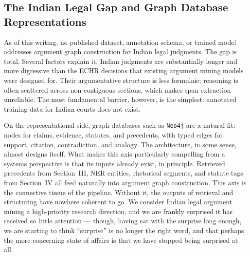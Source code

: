 \subsection{The Indian Legal Gap and Graph Database Representations}

As of this writing, no published dataset, annotation schema, or trained model addresses argument graph construction for Indian legal judgments. The gap is total. Several factors explain it. Indian judgments are substantially longer and more digressive than the ECHR decisions that existing argument mining models were designed for. Their argumentative structure is less formulaic; reasoning is often scattered across non-contiguous sections, which makes span extraction unreliable. The most fundamental barrier, however, is the simplest: annotated training data for Indian courts does not exist.

On the representational side, graph databases such as \texttt{Neo4j} are a natural fit: nodes for claims, evidence, statutes, and precedents, with typed edges for support, citation, contradiction, and analogy. The architecture, in some sense, almost designs itself. What makes this axis particularly compelling from a systems perspective is that its inputs already exist, in principle. Retrieved precedents from Section~III, NER entities, rhetorical segments, and statute tags from Section~IV all feed naturally into argument graph construction. This axis is the connective tissue of the pipeline. Without it, the outputs of retrieval and structuring have nowhere coherent to go. We consider Indian legal argument mining a high-priority research direction, and we are frankly surprised it has received so little attention — though, having sat with the surprise long enough, we are starting to think ``surprise'' is no longer the right word, and that perhaps the more concerning state of affairs is that we have stopped being surprised at all.
